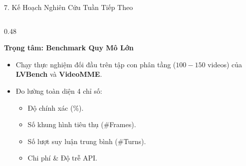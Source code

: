 \documentclass[aspectratio=169, 10pt]{beamer}
\begin{document}
\begin{frame}{7. Kế Hoạch Nghiên Cứu Tuần Tiếp Theo}
    \begin{columns}[T]
        \begin{column}{0.48\textwidth}
            \begin{alertblock}{\textbf{Trọng tâm: Benchmark Quy Mô Lớn}}
                \begin{itemize}
                    \item Chạy thực nghiệm đối đầu trên tập con phân tầng ($100-150$ videos) của \textbf{LVBench} và \textbf{VideoMME}.
                    \item Đo lường toàn diện 4 chỉ số:
                    \begin{itemize}\footnotesize
                        \item Độ chính xác (\%).
                        \item Số khung hình tiêu thụ (\#Frames).
                        \item Số lượt suy luận trung bình (\#Turns).
                        \item Chi phí \& Độ trễ API.
                    \end{itemize}
                \end{itemize}
            \end{alertblock}
        \end{column}

    \end{columns}
\end{frame}
\end{document}
